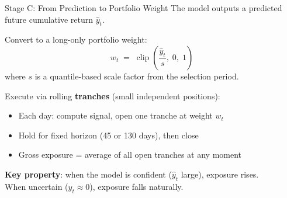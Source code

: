 \documentclass[aspectratio=169]{beamer}
\begin{document}
\begin{frame}{Stage C: From Prediction to Portfolio Weight}
  The model outputs a predicted future cumulative return \(\hat{y}_t\).

  \vspace{0.5em}
  Convert to a long-only portfolio weight:
  \[
    w_t \;=\; \operatorname{clip}\!\left(\frac{\hat{y}_t}{s},\; 0,\; 1\right)
  \]
  where \(s\) is a quantile-based scale factor from the selection period.

  \vspace{0.5em}
  Execute via rolling \textbf{tranches} (small independent positions):
  \begin{itemize}
    \item Each day: compute signal, open one tranche at weight \(w_t\)
    \item Hold for fixed horizon (45 or 130 days), then close
    \item Gross exposure = average of all open tranches at any moment
  \end{itemize}

  \vspace{0.4em}
  \textbf{Key property}: when the model is confident (\(\hat{y}_t\) large), exposure rises.\\
  When uncertain (\(\hat{y}_t \approx 0\)), exposure falls naturally.
\end{frame}
\end{document}
